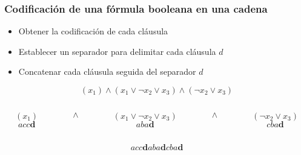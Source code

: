 \documentclass{beamer}
\begin{document}
\begin{frame}
    \frametitle{Codificación de una fórmula booleana en una cadena}

    \begin{itemize}
        \item Obtener la codificación de cada cláusula
              \pause
        \item Establecer un separador para delimitar cada cláusula $d$
              \pause
        \item Concatenar cada cláusula seguida del separador $d$
    \end{itemize}

    \pause

    \begin{Large}
        $$(x_1)\wedge (x_1\vee \neg x_2 \vee x_3)\wedge (\neg x_2\vee x_3)$$

        \pause

        \begin{columns}
            \begin{column}{1cm}
                $$(x_1)$$
                $$acc\mathbf{d}$$
            \end{column}
            \pause
            \begin{column}{0.2cm}
                $$\wedge$$
                $$\ $$
            \end{column}
            \begin{column}{3cm}
                $$(x_1\vee \neg x_2 \vee x_3)$$
                $$aba\mathbf{d}$$
            \end{column}
            \pause
            \begin{column}{0.2cm}
                $$\wedge$$
                $$\ $$
            \end{column}
            \begin{column}{2cm}
                $$(\neg x_2\vee x_3)$$
                $$cba\mathbf{d}$$
            \end{column}
        \end{columns}
        \pause

        $$acc\mathbf{d}aba\mathbf{d}cba\mathbf{d}$$
    \end{Large}


\end{frame}
\end{document}
